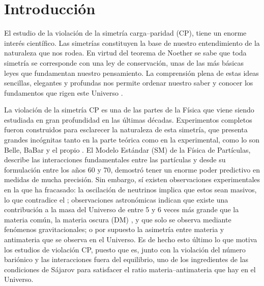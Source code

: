 \chapter{Introducción}
\label{cha:intro}


El estudio de la violación de la simetría carga--paridad (CP), tiene un enorme interés científico. Las simetrías constituyen la base de nuestro entendimiento de la naturaleza que nos rodea. En virtud del teorema de Noether se sabe que toda simetría se corresponde con una ley de conservación, unas de las más básicas leyes que fundamentan nuestro pensamiento. La comprensión plena de estas ideas sencillas, elegantes y profundas nos permite ordenar nuestro saber y conocer los fundamentos que rigen este Universo \cite{romeroTFG}.

La violación de la simetría CP es una de las partes de la Física que viene siendo estudiada en gran profundidad en las últimas décadas. Experimentos completos fueron construidos para esclarecer la naturaleza de esta simetría, que presenta grandes incógnitas tanto en la parte teórica como en la experimental, como lo son Belle, BaBar y el propio \lhcb.
El Modelo Estándar (SM) de la Física de Partículas, describe las interacciones fundamentales entre las partículas y desde su formulación entre los años 60 y 70, demostró tener un enorme poder predictivo en medidas de mucha precisión. Sin embargo, sí existen observaciones experimentales en la que ha fracasado: la oscilación de neutrinos \cite{maltoni2004status} implica que estos sean masivos, lo que contradice el \stdmod; observaciones astronómicas indican que existe una contribución a la masa del Universo de entre 5 y 6 veces más grande que la materia común, la materia oscura (DM) \cite{bertone2005particle}, y que solo se observa mediante fenómenos gravitacionales; o por supuesto la asimetría entre materia y antimateria que se observa en el Universo. Es de hecho esto último lo que motiva los estudios de violación CP, puesto que es, junto con la violación del número bariónico y las interacciones fuera del equilibrio, uno de los ingredientes de las condiciones de Sájarov \cite{Sakharov:1967dj} para satisfacer el ratio materia--antimateria que hay en el Universo.


